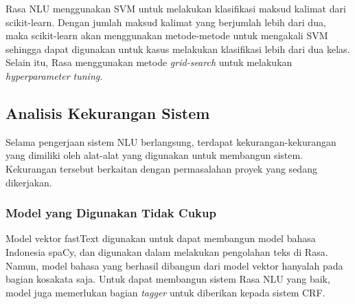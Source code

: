 Rasa NLU menggunakan SVM untuk melakukan klasifikasi maksud kalimat dari scikit-learn. Dengan jumlah maksud kalimat yang berjumlah lebih dari dua, maka scikit-learn akan menggunakan metode-metode untuk mengakali SVM sehingga dapat digunakan untuk kasus melakukan klasifikasi lebih dari dua kelas. Selain itu, Rasa menggunakan metode \textit{grid-search} untuk melakukan \textit{hyperparameter tuning.}

\subsection{Analisis Kekurangan Sistem}

Selama pengerjaan sistem NLU berlangsung, terdapat kekurangan-kekurangan yang dimiliki oleh alat-alat yang digunakan untuk membangun sistem. Kekurangan tersebut berkaitan dengan permasalahan proyek yang sedang dikerjakan.

\subsubsection{Model yang Digunakan Tidak Cukup}

Model vektor fastText digunakan untuk dapat membangun model bahasa Indonesia spaCy, dan digunakan dalam melakukan pengolahan teks di Rasa. Namun, model bahasa yang berhasil dibangun dari model vektor hanyalah pada bagian kosakata saja. Untuk dapat membangun sistem Rasa NLU yang baik, model juga memerlukan bagian \textit{tagger} untuk diberikan kepada sistem CRF.

%
%
